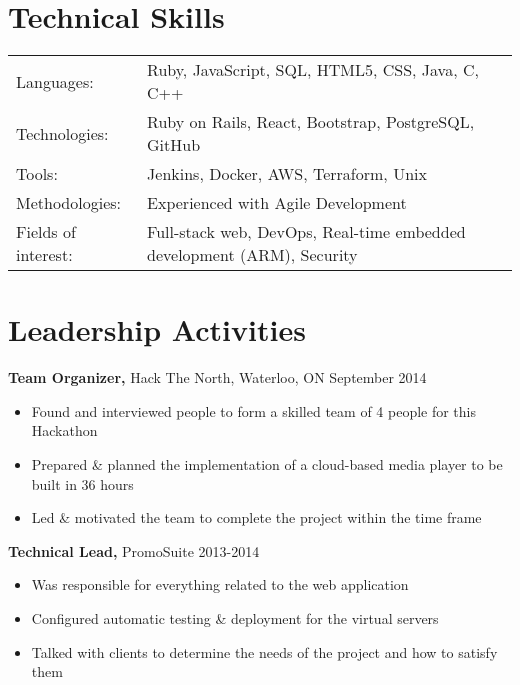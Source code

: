 \documentclass[line, centered]{res}
\begin{document}
\begin{resume}
\section{Technical Skills}
   \begin{tabular}{l l}
    Languages: & Ruby, JavaScript, SQL, HTML5, CSS, Java, C, C++
    \\
    Technologies: &  Ruby on Rails, React, Bootstrap, PostgreSQL, GitHub
    \\
    Tools: & Jenkins, Docker, AWS, Terraform, Unix
    \\
    Methodologies: & Experienced with Agile Development
    \\
    Fields of interest: & Full-stack web, DevOps, Real-time embedded development (ARM), Security
 \end{tabular}


\section{Leadership   Activities} 
         {\bf Team Organizer,} Hack The North, Waterloo, ON    \hfill         September 2014
         \begin{itemize} \itemsep -2pt
              \item Found and interviewed people to form a skilled team of 4 people for this Hackathon
              \item Prepared \& planned the implementation of a cloud-based media player to be built in 36 hours
              \item Led \& motivated the team to complete the project within the time frame

		 \end{itemize}

		{\bf Technical Lead,} PromoSuite \hfill   2013-2014
         \begin{itemize} \itemsep -2pt
                 \item Was responsible for everything related to the web application
                 \item Configured automatic testing \& deployment for the virtual servers
		 \item Talked with clients to determine the needs of the project and how to satisfy them
	\end{itemize}

\end{resume} 
\end{document}
